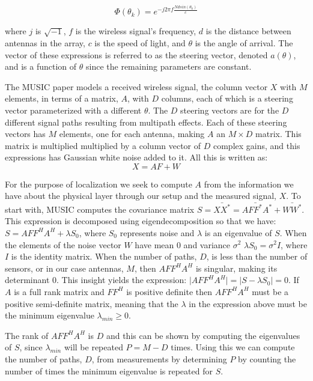 \documentclass[12pt]{report}
\begin{document}
$$\Phi(\theta_{k}) = e^{-j 2 \pi f \frac{N d sin(\theta_{k})}{c}}$$

where $j$ is $\sqrt{-1}$, $f$ is the wireless signal's frequency, $d$ is the distance between antennas in the array, $c$ is the speed of light, and $\theta$ is the angle of arrival. The vector of these expressions is referred to as the steering vector, denoted $a(\theta)$, and is a function of $\theta$ since the remaining parameters are constant. 

The MUSIC paper models a received wireless signal, the column vector $X$ with $M$ elements, in terms of a matrix, $A$, with $D$ columns, each of which is a steering vector parameterized with a different $\theta$. The $D$ steering vectors are for the $D$ different signal paths resulting from multipath effects. Each of these steering vectors has $M$ elements, one for each antenna, making $A$ an $M \times D$ matrix. This matrix is multiplied multiplied by a column vector of $D$ complex gains, and this expressions has Gaussian white noise added to it. All this is written as: \\

$$X = AF + W$$

For the purpose of localization we seek to compute $A$ from the information we have about the physical layer through our setup and the measured signal, $X$. To start with, MUSIC computes the covariance matrix $S = \bar{XX^{*}} = A \bar{FF^{*}} A^{*} + \bar{WW^{*}}$. This expression is decomposed using eigendecomposition so that we have: $S = A FF^{H} A^{H} + \lambda S_{0}$, where $S_{0}$ represents noise and $\lambda$ is an eigenvalue of $S$. When the elements of the noise vector $W$ have mean 0 and variance $\sigma^{2}$ $\lambda S_{0} = \sigma^{2} I$, where $I$ is the identity matrix. When the number of paths, $D$, is less than the number of sensors, or in our case antennas, $M$, then $A FF^{H} A^{H}$ is singular, making its determinant 0. This insight yields the expression: $\lvert A FF^{H} A^{H} \rvert = \lvert S - \lambda S_{0} \rvert = 0$. If $A$ is a full rank matrix and $FF^{H}$ is positive definite then $A FF^{H} A^{H}$ must be a positive semi-definite matrix, meaning that the $\lambda$ in the expression above must be the minimum eigenvalue $\lambda_{min} \geq 0$. \par

The rank of $A FF^{H} A^{H}$ is $D$ and this can be shown by computing the eigenvalues of $S$, since $\lambda_{min}$ will be repeated $P = M - D$ times. Using this we can compute the number of paths, $D$, from measurements by determining $P$ by counting the number of times the minimum eigenvalue is repeated for $S$. \par
\end{document}
